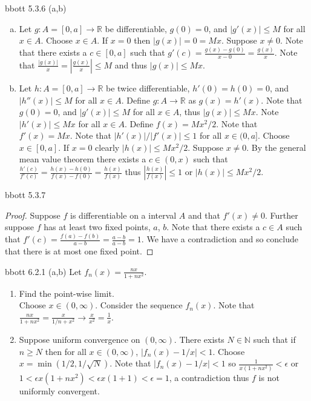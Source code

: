 \documentclass[12pt]{article}
\makeatletter
\theoremstyle{homework}
\newenvironment{exercise}[1]
{\def\@currentlabel{#1}\exercisecore}
{\endexercisecore}
\makeatother
\begin{document}
\begin{exercise}

Abbott 5.3.6 (a,b)
\end{exercise}
\begin{enumerate}[(a)]
\item
Let $g:A=[0,a]\rightarrow \mathbb{R}$ be differentiable, $g(0)=0$, and $|g'(x)|\leq M$ for all $x\in A$.  Choose $x\in A$.  If $x=0$ then $|g(x)|=0=Mx$.  Suppose $x\neq 0$.  Note that there exists a $c\in[0,a]$ such that $g'(c)=\frac{g(x)-g(0)}{x-0}=\frac{g(x)}{x}$.  Note that $\frac{|g(x)|}{x}=|\frac{g(x)}{x}|\leq M$ and thus $|g(x)|\leq Mx$.
\item
Let $h:A=[0,a]\rightarrow \mathbb{R}$ be twice differentiable, $h'(0)=h(0)=0$, and $|h''(x)|\leq M$ for all $x\in A$.  Define $g:A\rightarrow \mathbb{R}$ as $g(x)=h'(x)$.  Note that $g(0)=0$, and $|g'(x)|\leq M$ for all $x\in A$, thus $|g(x)|\leq Mx$.  Note $|h'(x)|\leq Mx$ for all $x\in A$.  Define $f(x)=Mx^2/2$.  Note that $f'(x)=Mx$.  Note that $|h'(x)|/|f'(x)|\leq 1$ for all $x\in (0,a]$.  Choose $x\in [0,a]$.  If $x=0$ clearly $|h(x)|\leq Mx^2/2$.  Suppose $x\neq 0$.  By the general mean value theorem there exists a $c\in (0,x)$ such that $\frac{h'(c)}{f'(c)}=\frac{h(x)-h(0)}{f(x)-f(0)}=\frac{h(x)}{f(x)}$ thus $|\frac{h(x)}{f(x)}|\leq 1$ or $|h(x)|\leq Mx^2/2$.
\end{enumerate}
\begin{exercise}

Abbott 5.3.7
\end{exercise}
\begin{proof}
Suppose $f$ is differentiable on a interval $A$ and that $f'(x)\neq 0$.  Further suppose $f$ has at least two fixed points, $a$, $b$.  Note that there exists a $c\in A$ such that $f'(c)=\frac{f(a)-f(b)}{a-b}=\frac{a-b}{a-b}=1$.  We have a contradiction and so conclude that there is at most one fixed point.
\end{proof}

\begin{exercise}

Abbott 6.2.1 (a,b)
\end{exercise}
Let $f_n(x)=\frac{nx}{1+nx^2}$.
\begin{enumerate}
\item
Find the point-wise limit.\\
Choose $x\in(0,\infty)$.  Consider the sequence $f_n(x)$.  Note that $\frac{nx}{1+nx^2}=\frac{x}{1/n+x^2}\rightarrow \frac{x}{x^2}=\frac{1}{x}$.
\item
Suppose uniform convergence on $(0,\infty)$.  There exists $N\in\mathbb{N}$ such that if $n\geq N$ then for all $x\in (0,\infty)$, $|f_n(x)-1/x|<1$.  Choose $x=\min(1/2,1/\sqrt{N})$.  Note that $|f_n(x)-1/x|<1$ so $\frac{1}{x(1+nx^2)}<\epsilon$ or $1<\epsilon x(1+nx^2)<\epsilon x(1+1)<\epsilon=1$, a contradiction thus $f$ is not uniformly convergent.
\end{enumerate}
\end{document}
